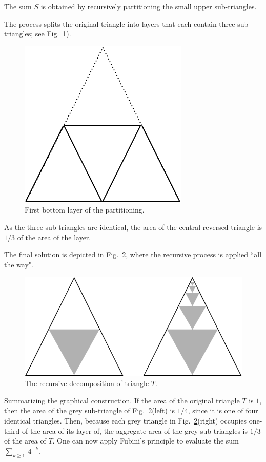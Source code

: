 \begin{itemize}
\smallskip

The sum $S$ is obtained by recursively partitioning the small upper sub-triangles. 

The process splits the original triangle into layers that each contain three sub-triangles; see
Fig.~\ref{Fig:Sum1over4FirstLayer}). 
\begin{figure}
\begin{center}
        \includegraphics[scale=0.3]{FiguresMaths/Sum1over4FirstLayer}
        \caption{First bottom layer of the partitioning.}
        \label{Fig:Sum1over4FirstLayer}
\end{center}
\end{figure}
As the three sub-triangles are identical, the area of the central reversed triangle is $1/3$ of the area of the layer. 

\smallskip

The final solution is depicted in Fig.~\ref{Fig:Sum1over4cascade}, where the recursive process is applied ``all the way". 
\begin{figure}
\begin{center}
        \includegraphics[scale=0.3]{FiguresMaths/Sum1over4cascade}
        \caption{The recursive decomposition of triangle $T$.}
        \label{Fig:Sum1over4cascade}
\end{center}
\end{figure}
Summarizing  the graphical construction.  If the area of the original triangle $T$ is $1$, then 
the area of the grey sub-triangle of Fig.~\ref{Fig:Sum1over4cascade}(left) is $1/4$, since it is one of four identical triangles.  Then, because each grey triangle in Fig.~\ref{Fig:Sum1over4cascade}(right) occupies one-third of the area of its layer of, the aggregate area of the grey sub-triangles is $1/3$ of the area of $T$.  One can now apply Fubini's principle to evaluate the sum $\sum_{k \geq 1} \ 4^{-k}$.
\end{itemize}
